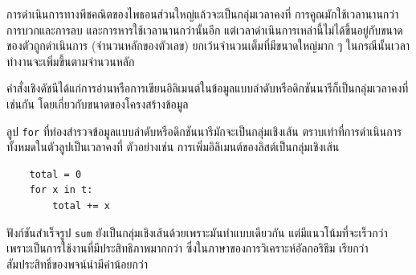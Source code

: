 
การดำเนินการทางพีชคณิตของไพธอนส่วนใหญ่แล้วจะเป็นกลุ่มเวลาคงที่ 
การคูณมักใช้เวลานานกว่าการบวกและการลบ 
และการหารใช้เวลานานกว่านั้นอีก แต่เวลาดำเนินการเหล่านี้ไม่ได้ขึ้นอยู่กับขนาดของตัวถูกดำเนินการ (จำนวนหลักของตัวเลข) 
ยกเว้นจำนวนเต็มที่มีขนาดใหญ่มาก ๆ ในกรณีนั้นเวลาทำงานจะเพิ่มขึ้นตามจำนวนหลัก 



คำสั่งเชิงดัชนีได้แก่การอ่านหรือการเขียนอิลิเมนต์ในข้อมูลแบบลำดับหรือดิกชันนารีก็เป็นกลุ่มเวลาคงที่เช่นกัน
โดยเกี่ยวกับขนาดของโครงสร้างข้อมูล


ลูป {\tt for} ที่ท่องสำรวจข้อมูลแบบลำดับหรือดิกชันนารีมักจะเป็นกลุ่มเชิงเส้น 
ตราบเท่าที่การดำเนินการทั้งหมดในตัวลูปเป็นเวลาคงที่ 
ตัวอย่างเช่น การเพิ่มอิลิเมนต์ของลิสต์เป็นกลุ่มเชิงเส้น

\begin{verbatim}
    total = 0
    for x in t:
        total += x
\end{verbatim}


ฟังก์ชันสำเร็จรูป {\tt sum} ยังเป็นกลุ่มเชิงเส้นด้วยเพราะมันทำแบบเดียวกัน 
แต่มีแนวโน้มที่จะเร็วกว่าเพราะเป็นการใช้งานที่มีประสิทธิภาพมากกว่า 
ซึ่งในภาษาของการวิเคราะห์อัลกอริธึม เรียกว่า สัมประสิทธิ์ของพจน์นำมีค่าน้อยกว่า



